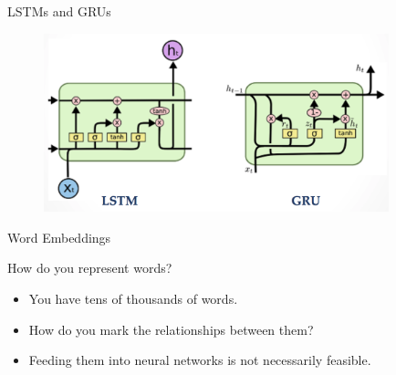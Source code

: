 \documentclass[aspectratio=169, 11pt]{beamer}
\begin{document}
\begin{frame}{LSTMs and GRUs}
  \begin{figure}[!ht]
    \centering
    \includegraphics[width=100mm]{diagrams/presentation/lstm_gru.png}
  \end{figure}
\end{frame}

\begin{frame}{Word Embeddings}
  \begin{block}{How do you represent words?}
    \begin{itemize}
      \item You have tens of thousands of words.
      \item How do you mark the relationships between them?
      \item Feeding them into neural networks is not necessarily feasible.
    \end{itemize}
  \end{block}
\end{frame}
\end{document}
